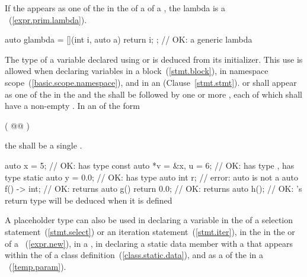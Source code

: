 \pnum
If the   appears as one of the
 in the  of a
 of a , the
%
lambda is a ~(\ref{expr.prim.lambda}). \begin{example}
\begin{codeblock}
auto glambda = [](int i, auto a) { return i; }; // OK: a generic lambda
\end{codeblock}
\end{example}

\pnum
The type of a variable declared using  or  is
deduced from its initializer. This use is allowed when declaring variables in a
block~(\ref{stmt.block}), in
namespace scope~(\ref{basic.scope.namespace}), and in an
 (Clause~\ref{stmt.stmt}).
 or  shall appear as one of the
 in the
 and the
shall be followed by one or more , each of which shall
have a non-empty . In an
 of the form

\begin{codeblock}
( @@ )
\end{codeblock}

the  shall be a single
.

\begin{example}
\begin{codeblock}
auto x = 5;                 // OK:  has type 
const auto *v = &x, u = 6;  // OK:  has type ,  has type 
static auto y = 0.0;        // OK:  has type 
auto int r;                 // error: auto is not a 
auto f() -> int;            // OK:  returns 
auto g() { return 0.0; }    // OK:  returns 
auto h();                   // OK: 's return type will be deduced when it is defined
\end{codeblock}
\end{example}

\pnum
A placeholder type can also be used in declaring a variable in
the  of a selection statement~(\ref{stmt.select}) or an iteration
statement~(\ref{stmt.iter}), in the  in 
the  or  of a
~(\ref{expr.new}), in a
,
in declaring a static data member with a
 that appears within the
 of a class definition~(\ref{class.static.data}),
and as a 
of the 
in a ~(\ref{temp.param}).

